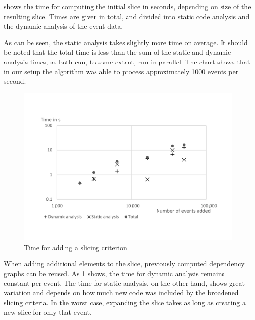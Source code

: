  shows the time for computing the initial slice in seconds, depending on size of the resulting slice.
Times are given in total, and divided into static code analysis and the dynamic analysis of the event data.

As can be seen, the static analysis takes slightly more time on average.
It should be noted that the total time is less than the sum of the static and dynamic analysis times, as both can, to some extent, run in parallel.
The chart shows that in our setup the algorithm was able to process approximately 1000 events per second.

\begin{figure}
	\centering
		\includegraphics[width=\linewidth, clip, trim={20mm 26mm 20mm 26mm}]{img/chart-add.pdf}
	\caption{Time for adding a slicing criterion}
	\label{fig:chartadd}
\end{figure}

When adding additional elements to the slice, previously computed dependency graphs can be reused.
As \cref{fig:chartadd} shows, the time for dynamic analysis remains constant per event.
The time for static analysis, on the other hand, shows great variation and depends on how much new code was included by the broadened slicing criteria.
In the worst case, expanding the slice takes as long as creating a new slice for only that event.

